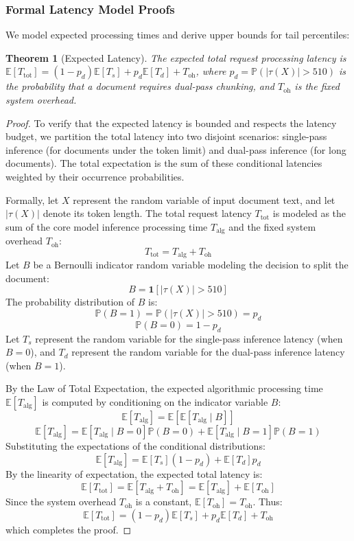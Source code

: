 \documentclass[11pt,a4paper]{article}
\theoremstyle{plain}
\newtheorem{theorem}{Theorem}[section]
\theoremstyle{definition}
\theoremstyle{remark}
\newcommand{\E}{\mathbb{E}}
\newcommand{\Prob}{\mathbb{P}}
\begin{document}
\subsubsection{Formal Latency Model Proofs}

We model expected processing times and derive upper bounds for tail percentiles:

\begin{theorem}[Expected Latency]\label{thm:elat}
The expected total request processing latency is $\E[T_{\mathrm{tot}}] = (1-p_d)\E[T_s] + p_d\E[T_d] + T_{\mathrm{oh}}$, where $p_d=\Prob(|\tau(X)|>510)$ is the probability that a document requires dual-pass chunking, and $T_{\mathrm{oh}}$ is the fixed system overhead.
\end{theorem}
\begin{proof}
To verify that the expected latency is bounded and respects the latency budget, we partition the total latency into two disjoint scenarios: single-pass inference (for documents under the token limit) and dual-pass inference (for long documents). The total expectation is the sum of these conditional latencies weighted by their occurrence probabilities.

Formally, let $X$ represent the random variable of input document text, and let $|\tau(X)|$ denote its token length. The total request latency $T_{\mathrm{tot}}$ is modeled as the sum of the core model inference processing time $T_{\text{alg}}$ and the fixed system overhead $T_{\mathrm{oh}}$:
$$T_{\mathrm{tot}} = T_{\text{alg}} + T_{\mathrm{oh}}$$
Let $B$ be a Bernoulli indicator random variable modeling the decision to split the document:
$$B = \mathbf{1}[|\tau(X)| > 510]$$
The probability distribution of $B$ is:
$$\Prob(B = 1) = \Prob(|\tau(X)| > 510) = p_d$$
$$\Prob(B = 0) = 1 - p_d$$
Let $T_s$ represent the random variable for the single-pass inference latency (when $B = 0$), and $T_d$ represent the random variable for the dual-pass inference latency (when $B = 1$). 

By the Law of Total Expectation, the expected algorithmic processing time $\E[T_{\text{alg}}]$ is computed by conditioning on the indicator variable $B$:
$$\E[T_{\text{alg}}] = \E[\E[T_{\text{alg}} \mid B]]$$
$$\E[T_{\text{alg}}] = \E[T_{\text{alg}} \mid B=0]\Prob(B=0) + \E[T_{\text{alg}} \mid B=1]\Prob(B=1)$$
Substituting the expectations of the conditional distributions:
$$\E[T_{\text{alg}}] = \E[T_s](1 - p_d) + \E[T_d]p_d$$
By the linearity of expectation, the expected total latency is:
$$\E[T_{\mathrm{tot}}] = \E[T_{\text{alg}} + T_{\mathrm{oh}}] = \E[T_{\text{alg}}] + \E[T_{\mathrm{oh}}]$$
Since the system overhead $T_{\mathrm{oh}}$ is a constant, $\E[T_{\mathrm{oh}}] = T_{\mathrm{oh}}$. Thus:
$$\E[T_{\mathrm{tot}}] = (1-p_d)\E[T_s] + p_d\E[T_d] + T_{\mathrm{oh}}$$
which completes the proof.
\end{proof}
\end{document}
